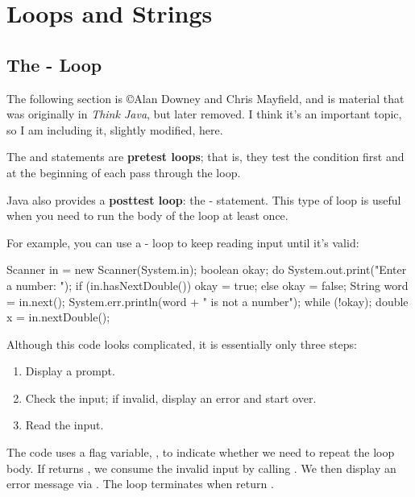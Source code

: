 \chapter{Loops and Strings}

\section{The - Loop}
The following section is \copyright Alan Downey and Chris Mayfield, and is material that was originally in {\it Think Java}, but later removed. I think it's an important topic, so I am including it, slightly modified, here.


The  and  statements are {\bf pretest loops}; that is, they test the condition first and at the beginning of each pass through the loop.


Java also provides a {\bf posttest loop}: the - statement.
This type of loop is useful when you need to run the body of the loop at least once.


For example, you can use a - loop to keep reading input until it's valid:

\begin{code}
Scanner in = new Scanner(System.in);
boolean okay;
do {
    System.out.print("Enter a number: ");
    if (in.hasNextDouble()) {
        okay = true;
    } else {
        okay = false;
        String word = in.next();
        System.err.println(word + " is not a number");
    }
} while (!okay);
double x = in.nextDouble();
\end{code}

Although this code looks complicated, it is essentially only three steps:

\begin{enumerate}
\item Display a prompt.
\item Check the input; if invalid, display an error and start over.
\item Read the input.
\end{enumerate}


The code uses a flag variable, , to indicate whether we need to repeat the loop body.
If  returns , we consume the invalid input by calling .
We then display an error message via .
The loop terminates when  return .

